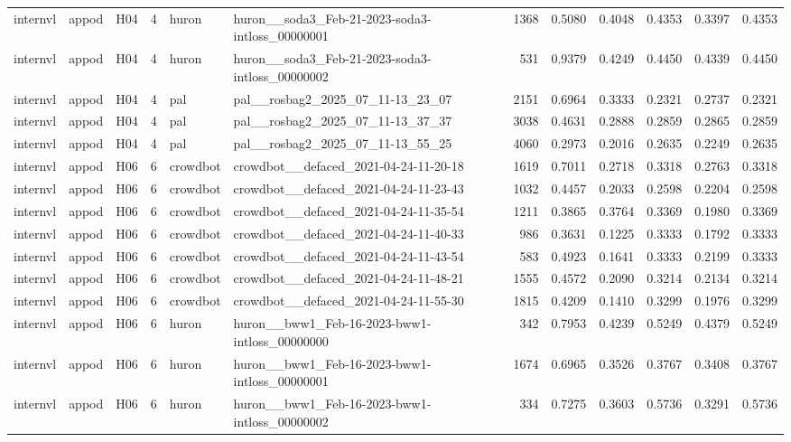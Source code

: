 \begin{table}[tbp]
\begin{tabular}{lllrllrrrrrr}
internvl & appod & H04 & 4 & huron & huron\_\_soda3\_Feb-21-2023-soda3-intloss\_00000001 & 1368 & 0.5080 & 0.4048 & 0.4353 & 0.3397 & 0.4353 \\
internvl & appod & H04 & 4 & huron & huron\_\_soda3\_Feb-21-2023-soda3-intloss\_00000002 & 531 & 0.9379 & 0.4249 & 0.4450 & 0.4339 & 0.4450 \\
internvl & appod & H04 & 4 & pal & pal\_\_rosbag2\_2025\_07\_11-13\_23\_07 & 2151 & 0.6964 & 0.3333 & 0.2321 & 0.2737 & 0.2321 \\
internvl & appod & H04 & 4 & pal & pal\_\_rosbag2\_2025\_07\_11-13\_37\_37 & 3038 & 0.4631 & 0.2888 & 0.2859 & 0.2865 & 0.2859 \\
internvl & appod & H04 & 4 & pal & pal\_\_rosbag2\_2025\_07\_11-13\_55\_25 & 4060 & 0.2973 & 0.2016 & 0.2635 & 0.2249 & 0.2635 \\
internvl & appod & H06 & 6 & crowdbot & crowdbot\_\_defaced\_2021-04-24-11-20-18 & 1619 & 0.7011 & 0.2718 & 0.3318 & 0.2763 & 0.3318 \\
internvl & appod & H06 & 6 & crowdbot & crowdbot\_\_defaced\_2021-04-24-11-23-43 & 1032 & 0.4457 & 0.2033 & 0.2598 & 0.2204 & 0.2598 \\
internvl & appod & H06 & 6 & crowdbot & crowdbot\_\_defaced\_2021-04-24-11-35-54 & 1211 & 0.3865 & 0.3764 & 0.3369 & 0.1980 & 0.3369 \\
internvl & appod & H06 & 6 & crowdbot & crowdbot\_\_defaced\_2021-04-24-11-40-33 & 986 & 0.3631 & 0.1225 & 0.3333 & 0.1792 & 0.3333 \\
internvl & appod & H06 & 6 & crowdbot & crowdbot\_\_defaced\_2021-04-24-11-43-54 & 583 & 0.4923 & 0.1641 & 0.3333 & 0.2199 & 0.3333 \\
internvl & appod & H06 & 6 & crowdbot & crowdbot\_\_defaced\_2021-04-24-11-48-21 & 1555 & 0.4572 & 0.2090 & 0.3214 & 0.2134 & 0.3214 \\
internvl & appod & H06 & 6 & crowdbot & crowdbot\_\_defaced\_2021-04-24-11-55-30 & 1815 & 0.4209 & 0.1410 & 0.3299 & 0.1976 & 0.3299 \\
internvl & appod & H06 & 6 & huron & huron\_\_bww1\_Feb-16-2023-bww1-intloss\_00000000 & 342 & 0.7953 & 0.4239 & 0.5249 & 0.4379 & 0.5249 \\
internvl & appod & H06 & 6 & huron & huron\_\_bww1\_Feb-16-2023-bww1-intloss\_00000001 & 1674 & 0.6965 & 0.3526 & 0.3767 & 0.3408 & 0.3767 \\
internvl & appod & H06 & 6 & huron & huron\_\_bww1\_Feb-16-2023-bww1-intloss\_00000002 & 334 & 0.7275 & 0.3603 & 0.5736 & 0.3291 & 0.5736 \\

\end{tabular}
\end{table}
